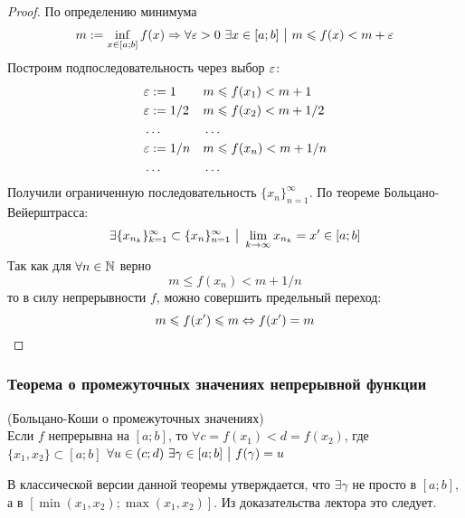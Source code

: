 \begin{proof}
	По определению минимума
	$$
		m := \inf\limits_{x \in [a; b]} f(x) \Rightarrow \forall \varepsilon > 0\ \exists x \in [a; b] \ \big|\  m \leqslant f(x) < m + \varepsilon
	$$
	Построим подпоследовательность через выбор $\varepsilon$:
	\begin{align*}
		&\varepsilon := 1 & &m \leqslant f(x_1) < m + 1
		\\
		&\varepsilon := 1/2 & &m \leqslant f(x_2) < m + 1/2
		\\
		&\dots & &\dots
		\\
		&\varepsilon := 1/n & &m \leqslant f(x_n) < m + 1/n
		\\
		&\dots & &\dots
	\end{align*}
	Получили ограниченную последовательность $\{x_n\}_{n = 1}^\infty$. По теореме Больцано-Вейерштрасса:
	$$
		\exists \{x_{n_k}\}_{k = 1}^\infty \subset \{x_n\}_{n = 1}^\infty \ \big|\  \lim\limits_{k \to \infty} x_{n_k} = x' \in [a; b] 
	$$
	Так как для $\forall n \in \mathbb{N}$ верно
	$$
		m \le f(x_n) < m + 1/n
	$$
	то в силу непрерывности $f$, можно совершить предельный переход:
	$$
		m \leqslant f(x') \leqslant m \Leftrightarrow f(x') = m
	$$
\end{proof}

\subsubsection{Теорема о промежуточных значениях непрерывной функции}

\begin{theorem} (Больцано-Коши о промежуточных значениях) \\
	Если $f$ непрерывна на $[a; b]$, то $\forall c = f(x_1) < d = f(x_2)$, где $\{x_1, x_2\} \subset [a; b]$ $\forall u \in (c; d)\ \exists \gamma \in [a; b] \ \big|\  f(\gamma) = u$
\end{theorem}

\begin{anote}
	В классической версии данной теоремы утверждается, что $\exists \gamma$ не просто в $[a; b]$, а в $[\min(x_1, x_2); \max(x_1, x_2)]$. Из доказательства лектора это следует.
\end{anote}

